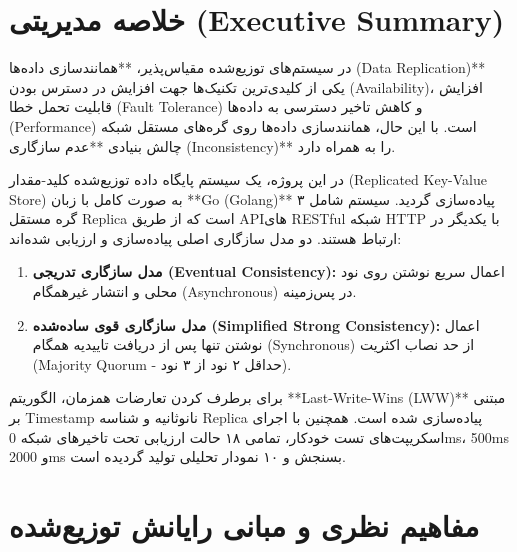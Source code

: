 \documentclass[12pt,a4paper]{article}
\begin{document}
\newpage
\tableofcontents
\newpage

\section{خلاصه مدیریتی (Executive Summary)}
در سیستم‌های توزیع‌شده مقیاس‌پذیر، **همانندسازی داده‌ها (Data Replication)** یکی از کلیدی‌ترین تکنیک‌ها جهت افزایش در دسترس بودن (Availability)، افزایش قابلیت تحمل خطا (Fault Tolerance) و کاهش تاخیر دسترسی به داده‌ها (Performance) است. با این حال، همانندسازی داده‌ها روی گره‌های مستقل شبکه چالش بنیادی **عدم سازگاری (Inconsistency)** را به همراه دارد.

در این پروژه، یک سیستم پایگاه داده توزیع‌شده کلید-مقدار (Replicated Key-Value Store) به صورت کامل با زبان **Go (Golang)** پیاده‌سازی گردید. سیستم شامل ۳ گره مستقل Replica است که از طریق APIهای RESTful شبکه HTTP با یکدیگر در ارتباط هستند. دو مدل سازگاری اصلی پیاده‌سازی و ارزیابی شده‌اند:
\begin{enumerate}
    \item \textbf{مدل سازگاری تدریجی (Eventual Consistency):} اعمال سریع نوشتن روی نود محلی و انتشار غیرهمگام (Asynchronous) در پس‌زمینه.
    \item \textbf{مدل سازگاری قوی ساده‌شده (Simplified Strong Consistency):} اعمال نوشتن تنها پس از دریافت تاییدیه همگام (Synchronous) از حد نصاب اکثریت (Majority Quorum - حداقل ۲ نود از ۳ نود).
\end{enumerate}

برای برطرف کردن تعارضات همزمان، الگوریتم **Last-Write-Wins (LWW)** مبتنی بر Timestamp نانوثانیه و شناسه Replica پیاده‌سازی شده است. همچنین با اجرای اسکریپت‌های تست خودکار، تمامی ۱۸ حالت ارزیابی تحت تاخیرهای شبکه 0ms، 500ms و 2000ms بسنجش و ۱۰ نمودار تحلیلی تولید گردیده است.

\section{مفاهیم نظری و مبانی رایانش توزیع‌شده}
\end{document}
